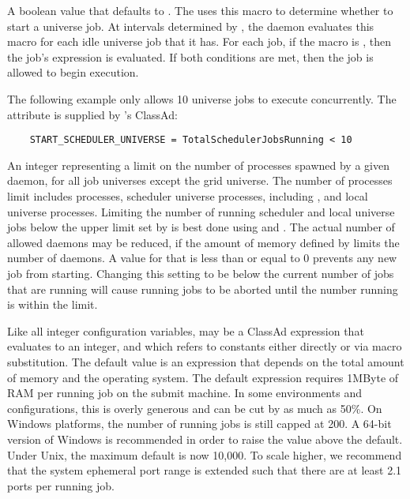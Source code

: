 \begin{description}
\label{param:StartSchedulerUniverse}
\item[\Macro{START\_SCHEDULER\_UNIVERSE}]
  A boolean value that defaults to .
  The  uses this macro to determine whether to start
  a  universe job. 
  At intervals determined by , 
  the  daemon evaluates this macro
  for each idle  universe job that it has.
  For each job, if the  
  macro is , then the job's  expression
  is evaluated. If both conditions are met, then the job is allowed
  to begin execution. 
  
  The following example only allows 10  universe jobs to
  execute concurrently. The attribute 
  is supplied by 's ClassAd:
  
  \footnotesize
  \begin{verbatim}
    START_SCHEDULER_UNIVERSE = TotalSchedulerJobsRunning < 10
  \end{verbatim}
  \normalsize
  
  
\label{param:MaxJobsRunning}
\item[\Macro{MAX\_JOBS\_RUNNING}]
  An integer representing a limit on the number of processes
  spawned by a given  daemon,
  for all job universes except the grid universe. 
  The number of processes limit includes  processes,
  scheduler universe processes, including , and
  local universe  processes.
  Limiting the number of running scheduler and local universe
  jobs below the upper limit set by  is best
  done using  and
  .
  The actual number of allowed  daemons may be reduced,
  if the amount of memory defined by  limits the
  number of  daemons.
  A value for  that is less than or equal to 0
  prevents any new job from starting.  Changing this setting to be below
  the current number of jobs that are running will cause running jobs to
  be aborted until the number running is within the limit.

  Like all integer configuration variables, 
  may be a ClassAd expression that evaluates to an integer, and which
  refers to constants either directly or via macro substitution.
  The default value is an expression that depends on the total amount
  of memory and the operating system.  The default
  expression requires 1MByte of RAM per running job on the submit machine.
  In some environments and configurations, this is overly
  generous and can be cut by as much as 50\%.
  On Windows platforms, the number of running jobs is still capped at 200.
  A 64-bit version of Windows  is recommended in order to raise the value
  above the default.
  Under Unix, the maximum default is now 10,000.  To scale higher, we
  recommend that the system ephemeral port range is extended
  such that there are at least 2.1 ports per running job.


\end{description}
